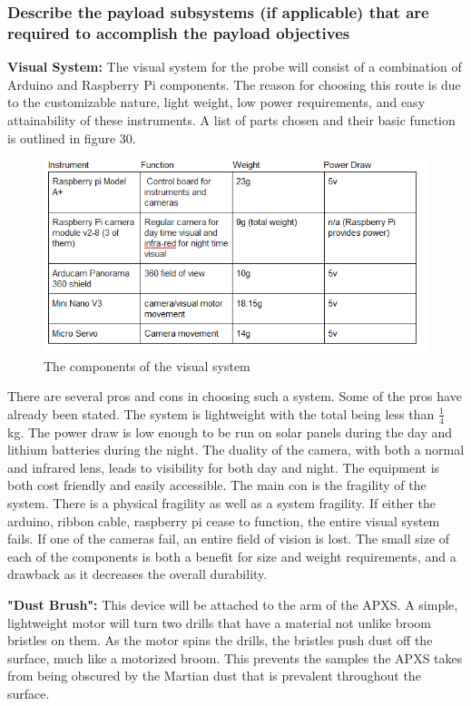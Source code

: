 \documentclass[%
 portrait,
 aapm,
 mph,%
 amsmath,amssymb,
 reprint,%
]{revtex4-2}
\begin{document}
\subsubsection{ Describe the payload subsystems (if applicable) that are required to
accomplish the payload objectives}
\textbf{Visual System: }The visual system for the probe will consist of a combination of Arduino and Raspberry Pi components. The reason for choosing this route is due to the customizable nature, light weight, low power requirements, and easy attainability of these instruments. A list of parts chosen and their basic function is outlined in figure 30. 
\begin{figure}
  \includegraphics[width=\textwidth]{Instruments/5_1_2_visualSystem.png}
   \caption{The components of the visual system}
\end{figure} 
There are several pros and cons in choosing such a system. Some of the pros have already been stated. The system is lightweight with the total being less than \begin{math} \frac{1}{4} \end{math} kg. The power draw is low enough to be run on solar panels during the day and lithium batteries during the night. The duality of the camera, with both a normal and infrared lens, leads to visibility for both day and night. The equipment is both cost friendly and easily accessible. 
The main con is the fragility of the system. There is a physical fragility as well as a system fragility. If either the arduino, ribbon cable, raspberry pi cease to function, the entire visual system fails. If one of the cameras fail, an entire field of vision is lost. The small size of each of the components is both a benefit for size and weight requirements, and a drawback as it decreases the overall durability. 

\textbf{"Dust Brush": }This device will be attached to the arm of the APXS. A simple, lightweight motor will turn two drills that have a material not unlike broom bristles on them. As the motor spins the drills, the bristles push dust off the surface, much like a motorized broom. This prevents the samples the APXS takes from being obscured by the Martian dust that is prevalent throughout the surface. 
\end{document}
